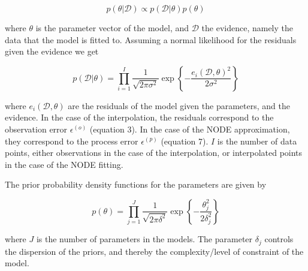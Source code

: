 \documentclass[11pt, oneside]{article}
\begin{document}
\vspace{-0.5cm}
\begin{equation}
	p(\theta | \mathcal{D}) \propto  p(\mathcal{D} | \theta) p(\theta)
\end{equation}

where $\theta$ is the parameter vector of the model, and $\mathcal{D}$ the evidence, namely the data that the model is fitted to.
Assuming a normal likelihood for the residuals given the evidence we get

\vspace{-0.5cm}
\begin{equation}
	p( \mathcal{D} | \theta) = \prod_{i=1}^{I} \frac{1}{\sqrt{2\pi\sigma^2}}  \exp \left\{ -\frac{e_i(\mathcal{D},\theta)^2}{2\sigma^2}  \right\}
\end{equation}

where $e_i(\mathcal{D},\theta)$ are the residuals of the model given the parameters, and the evidence. 
In the case of the interpolation, the residuals correspond to the observation error $\epsilon^{(o)}$ (equation 3).
In the case of the NODE approximation, they correspond to the process error $\epsilon^{(p)}$ (equation 7).
$I$ is the number of data points, either observations in the case of the interpolation, or interpolated points in the case of the NODE fitting.

The prior probability density functions for the parameters are given by

\vspace{-0.5cm}
\begin{equation}
	p(\theta) = \prod_{j=1}^{J} \frac{1}{\sqrt{2\pi\delta^2}}  \exp \left\{ -\frac{\theta_j^2}{2\delta_j^2}  \right\}
\end{equation}

where $J$ is the number of parameters in the models.
The parameter $\delta_j$ controls the dispersion of the priors, and thereby the complexity/level of constraint of the model.
\end{document}

